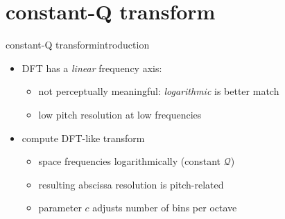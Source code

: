     \section[CQT]{constant-Q transform}
        \begin{frame}{constant-Q transform}{introduction}
            \begin{itemize}
                \item<1-> DFT has a \textit{linear} frequency axis:
                    \begin{itemize}
                        \item	not perceptually meaningful: \textit{logarithmic} is better match
                        \item	low pitch resolution at low frequencies
                    \end{itemize}
                \bigskip
                \item<2->[$\Rightarrow$] compute DFT-like transform {\color{highlight}{at specific frequencies}}
                    \begin{itemize}
                        \item   space frequencies logarithmically (constant $\mathcal{Q}$)
                        \item   resulting abscissa resolution is pitch-related
                        \item   parameter $c$ adjusts number of bins per octave
                    \end{itemize}
            \end{itemize}
            
            \bigskip
        \end{frame}	

